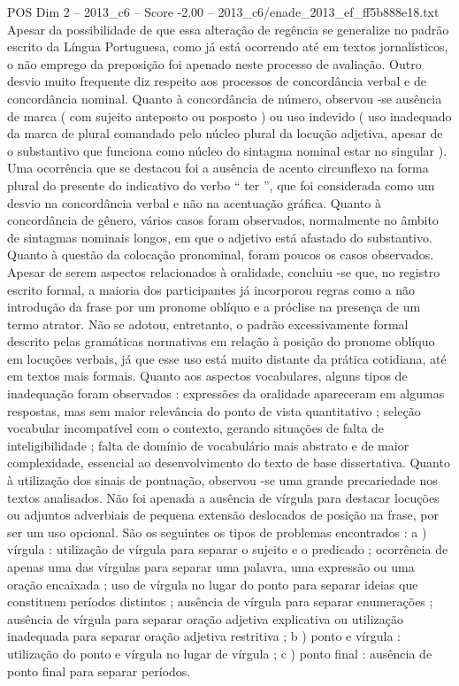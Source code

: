 \begin{textsample}{POS Dim 2 – 2013\_c6 – Score -2.00 – 2013\_c6/enade\_2013\_ef\_ff5b888e18.txt}
Apesar da possibilidade de que essa alteração de regência se generalize no padrão escrito da Língua Portuguesa, como já está ocorrendo até em textos jornalísticos, o não emprego da preposição foi apenado neste processo de avaliação.
Outro desvio muito frequente diz respeito aos processos de concordância verbal e de concordância nominal.
Quanto à concordância de número, observou -se ausência de marca ( com sujeito anteposto ou posposto ) ou uso indevido ( uso inadequado da marca de plural comandado pelo núcleo plural da locução adjetiva, apesar de o substantivo que funciona como núcleo do sintagma nominal estar no singular ).
Uma ocorrência que se destacou foi a ausência de acento circunflexo na forma plural do presente do indicativo do verbo “ ter ”, que foi considerada como um desvio na concordância verbal e não na acentuação gráfica.
Quanto à concordância de gênero, vários casos foram observados, normalmente no âmbito de sintagmas nominais longos, em que o adjetivo está afastado do substantivo.
Quanto à questão da colocação pronominal, foram poucos os casos observados.
Apesar de serem aspectos relacionados à oralidade, concluiu -se que, no registro escrito formal, a maioria dos participantes já incorporou regras como a não introdução da frase por um pronome oblíquo e a próclise na presença de um termo atrator.
Não se adotou, entretanto, o padrão excessivamente formal descrito pelas gramáticas normativas em relação à posição do pronome oblíquo em locuções verbais, já que esse uso está muito distante da prática cotidiana, até em textos mais formais.
Quanto aos aspectos vocabulares, alguns tipos de inadequação foram observados : expressões da oralidade apareceram em algumas respostas, mas sem maior relevância do ponto de vista quantitativo ; seleção vocabular incompatível com o contexto, gerando situações de falta de inteligibilidade ; falta de domínio de vocabulário mais abstrato e de maior complexidade, essencial ao desenvolvimento do texto de base dissertativa.
Quanto à utilização dos sinais de pontuação, observou -se uma grande precariedade nos textos analisados.
Não foi apenada a ausência de vírgula para destacar locuções ou adjuntos adverbiais de pequena extensão deslocados de posição na frase, por ser um uso opcional.
São os seguintes os tipos de problemas encontrados : a ) vírgula : utilização de vírgula para separar o sujeito e o predicado ; ocorrência de apenas uma das vírgulas para separar uma palavra, uma expressão ou uma oração encaixada ; uso de vírgula no lugar do ponto para separar ideias que constituem períodos distintos ; ausência de vírgula para separar enumerações ; ausência de vírgula para separar oração adjetiva explicativa ou utilização inadequada para separar oração adjetiva restritiva ; b ) ponto e vírgula : utilização do ponto e vírgula no lugar de vírgula ; c ) ponto final : ausência de ponto final para separar períodos.

\end{textsample}
